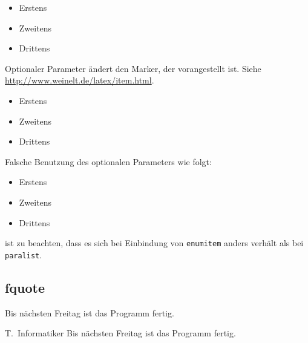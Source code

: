 \begin{itemize}
  \item Erstens
  \item Zweitens
  \item Drittens
\end{itemize}

Optionaler Parameter ändert den Marker, der vorangestellt ist.
Siehe \url{http://www.weinelt.de/latex/item.html}.
\begin{itemize}
  \item[A] Erstens
  \item[B] Zweitens
  \item[C] Drittens
\end{itemize}

Falsche Benutzung des optionalen Parameters wie folgt:
\begin{itemize}
  \item[first] Erstens
  \item[second] Zweitens
  \item[third] Drittens
\end{itemize}
 ist zu beachten, dass es sich bei Einbindung von \texttt{enumitem} anders verhält als bei \texttt{paralist}.

\subsection{fquote}

\begin{fquote}[T.\ Informatiker]
  Bis nächsten Freitag ist das Programm fertig.
\end{fquote}

\begin{gfquote}{T.\ Informatiker}
  Bis nächsten Freitag ist das Programm fertig.
\end{gfquote}


